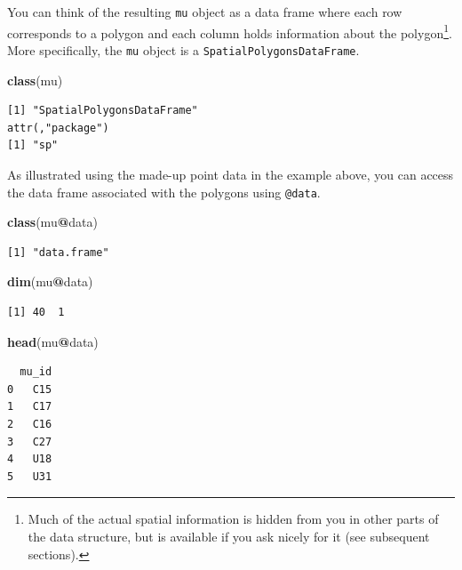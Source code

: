 \documentclass[
]{krantz}
\makeatletter
\newenvironment{Shaded}{\begin{snugshade}}{\end{snugshade}}
\newcommand{\KeywordTok}[1]{\textcolor[rgb]{0.27,0.27,0.27}{\textbf{#1}}}
\newcommand{\NormalTok}[1]{#1}
\newcommand{\OperatorTok}[1]{\textcolor[rgb]{0.43,0.43,0.43}{\textbf{#1}}}
\newenvironment{kframe}{%
\medskip{}
\setlength{\fboxsep}{.8em}
 \def\at@end@of@kframe{}%
 \ifinner\ifhmode%
  \def\at@end@of@kframe{\end{minipage}}%
  \begin{minipage}{\columnwidth}%
 \fi\fi%
 \def\FrameCommand##1{\hskip\@totalleftmargin \hskip-\fboxsep
 \colorbox{shadecolor}{##1}\hskip-\fboxsep
     \hskip-\linewidth \hskip-\@totalleftmargin \hskip\columnwidth}%
 \MakeFramed {\advance\hsize-\width
   \@totalleftmargin\z@ \linewidth\hsize
   \@setminipage}}%
 {\par\unskip\endMakeFramed%
 \at@end@of@kframe}
\renewenvironment{Shaded}{\begin{kframe}}{\end{kframe}}
\makeatother
\begin{document}
You can think of the resulting \texttt{mu} object as a data frame where each row corresponds to a polygon and each column holds information about the polygon\footnote{Much of the actual spatial information is hidden from you in other parts of the data structure, but is available if you ask nicely for it (see subsequent sections).}. More specifically, the \texttt{mu} object is a \texttt{SpatialPolygonsDataFrame}.

\begin{Shaded}
\begin{Highlighting}[]
\KeywordTok{class}\NormalTok{(mu)}
\end{Highlighting}
\end{Shaded}

\begin{verbatim}
[1] "SpatialPolygonsDataFrame"
attr(,"package")
[1] "sp"
\end{verbatim}

As illustrated using the made-up point data in the example above, you can access the data frame associated with the polygons using \texttt{@data}.

\begin{Shaded}
\begin{Highlighting}[]
\KeywordTok{class}\NormalTok{(mu}\OperatorTok{@}\NormalTok{data)}
\end{Highlighting}
\end{Shaded}

\begin{verbatim}
[1] "data.frame"
\end{verbatim}

\begin{Shaded}
\begin{Highlighting}[]
\KeywordTok{dim}\NormalTok{(mu}\OperatorTok{@}\NormalTok{data)}
\end{Highlighting}
\end{Shaded}

\begin{verbatim}
[1] 40  1
\end{verbatim}

\begin{Shaded}
\begin{Highlighting}[]
\KeywordTok{head}\NormalTok{(mu}\OperatorTok{@}\NormalTok{data)}
\end{Highlighting}
\end{Shaded}

\begin{verbatim}
  mu_id
0   C15
1   C17
2   C16
3   C27
4   U18
5   U31
\end{verbatim}
\end{document}
